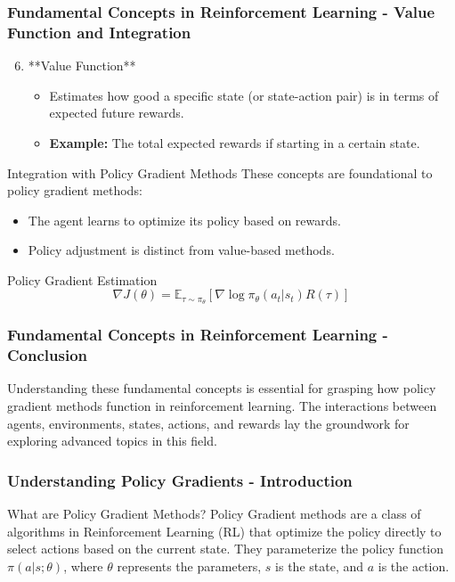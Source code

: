 \documentclass{beamer}
\begin{document}
\begin{frame}[fragile]
    \frametitle{Fundamental Concepts in Reinforcement Learning - Value Function and Integration}
    \begin{enumerate}
        \setcounter{enumi}{5} %
        \item **Value Function**
            \begin{itemize}
                \item Estimates how good a specific state (or state-action pair) is in terms of expected future rewards.
                \item \textbf{Example:} The total expected rewards if starting in a certain state.
            \end{itemize}
    \end{enumerate}
    
    \begin{block}{Integration with Policy Gradient Methods}
        These concepts are foundational to policy gradient methods:
        \begin{itemize}
            \item The agent learns to optimize its policy based on rewards.
            \item Policy adjustment is distinct from value-based methods.
        \end{itemize}
    \end{block}

    \begin{block}{Policy Gradient Estimation}
        \begin{equation}
        \nabla J(\theta) = \mathbb{E}_{\tau \sim \pi_\theta} \left[ \nabla \log \pi_\theta(a_t | s_t) R(\tau) \right]
        \end{equation}
    \end{block}
\end{frame}

\begin{frame}[fragile]
    \frametitle{Fundamental Concepts in Reinforcement Learning - Conclusion}
    Understanding these fundamental concepts is essential for grasping how policy gradient methods function in reinforcement learning. The interactions between agents, environments, states, actions, and rewards lay the groundwork for exploring advanced topics in this field.
\end{frame}

\begin{frame}[fragile]
    \frametitle{Understanding Policy Gradients - Introduction}
    \begin{block}{What are Policy Gradient Methods?}
        Policy Gradient methods are a class of algorithms in Reinforcement Learning (RL) that optimize the policy directly to select actions based on the current state. 
        They parameterize the policy function $\pi(a|s; \theta)$, where $\theta$ represents the parameters, $s$ is the state, and $a$ is the action.
    \end{block}
\end{frame}
\end{document}
